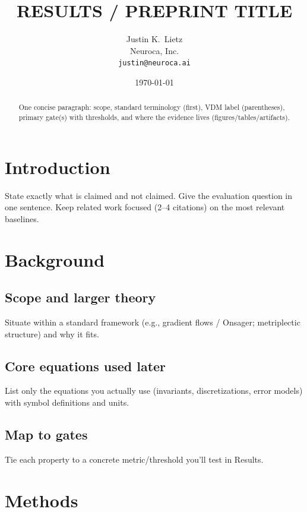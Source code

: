 \documentclass{article}
\title{RESULTS / PREPRINT TITLE}
\author{Justin K.\ Lietz\\
Neuroca, Inc.\\
\texttt{justin@neuroca.ai}}
\date{\today}
\begin{document}
\maketitle

\begin{abstract}
One concise paragraph: scope, standard terminology (first), VDM label (parentheses),
primary gate(s) with thresholds, and where the evidence lives (figures/tables/artifacts).
\end{abstract}


\section{Introduction}
State exactly what is claimed and not claimed. Give the evaluation question in one sentence.
Keep related work focused (2–4 citations) on the most relevant baselines.

\section{Background}
\subsection*{Scope and larger theory}
Situate within a standard framework (e.g., gradient flows / Onsager; metriplectic structure) and why it fits.

\subsection*{Core equations used later}
List only the equations you actually use (invariants, discretizations, error models) with symbol definitions and units.

\subsection*{Map to gates}
Tie each property to a concrete metric/threshold you’ll test in Results.

\section{Methods}
\end{document}
